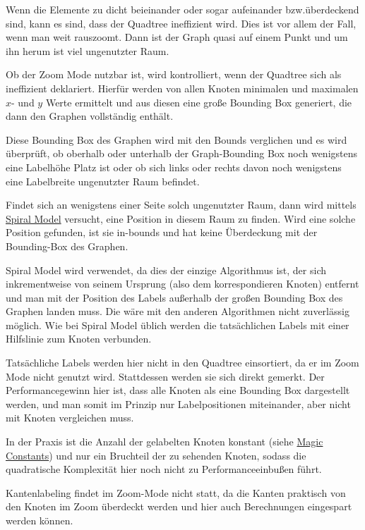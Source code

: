 
Wenn die Elemente zu dicht beieinander oder sogar aufeinander bzw.überdeckend sind, kann es sind, dass der Quadtree ineffizient wird.
Dies ist vor allem der Fall, wenn man weit rauszoomt.
Dann ist der Graph quasi auf einem Punkt und um ihn herum ist viel ungenutzter Raum.

Ob der Zoom Mode nutzbar ist, wird kontrolliert, wenn der Quadtree sich als ineffizient deklariert.
Hierfür werden von allen Knoten minimalen und maximalen $x$- und $y$ Werte ermittelt und
aus diesen eine große Bounding Box generiert, die dann den Graphen vollständig enthält.

Diese Bounding Box des Graphen wird mit den Bounds verglichen und es wird überprüft, ob
oberhalb oder unterhalb der Graph-Bounding Box noch wenigstens eine Labelhöhe Platz ist oder
ob sich links oder rechts davon noch wenigstens eine Labelbreite ungenutzter Raum befindet.

Findet sich an wenigstens einer Seite solch ungenutzter Raum, dann wird mittels \hyperref[subsubsec:spiral]{Spiral Model} versucht, eine Position in diesem Raum zu finden.
Wird eine solche Position gefunden, ist sie in-bounds und hat keine Überdeckung mit der Bounding-Box des Graphen.

Spiral Model wird verwendet, da dies der einzige Algorithmus ist, der sich inkrementweise von seinem Ursprung (also dem korrespondieren Knoten) entfernt und man mit der Position des Labels
außerhalb der großen Bounding Box des Graphen landen muss.
Die wäre mit den anderen Algorithmen nicht zuverlässig möglich.
Wie bei Spiral Model üblich werden die tatsächlichen Labels mit einer Hilfslinie zum Knoten verbunden.

Tatsächliche Labels werden hier nicht in den Quadtree einsortiert, da er im Zoom Mode nicht genutzt wird. Stattdessen werden sie sich direkt gemerkt.
Der Performancegewinn hier ist, dass alle Knoten als eine Bounding Box dargestellt werden, und man somit im Prinzip nur Labelpositionen miteinander, aber nicht mit Knoten vergleichen muss.

In der Praxis ist die Anzahl der gelabelten Knoten konstant (siehe \hyperref[subsec:consts]{Magic Constants}) und nur ein Bruchteil der zu sehenden Knoten,
sodass die quadratische Komplexität hier noch nicht zu Performanceeinbußen führt.

Kantenlabeling findet im Zoom-Mode nicht statt, da die Kanten praktisch von den Knoten im Zoom überdeckt werden und hier auch Berechnungen eingespart werden können.

